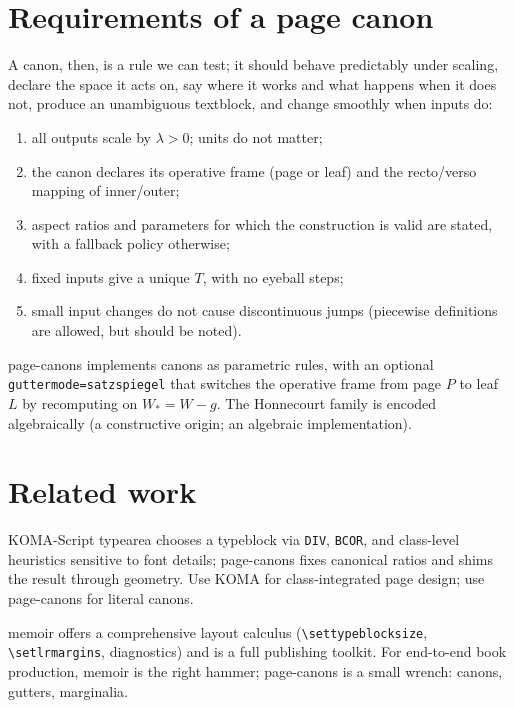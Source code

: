 \documentclass[11pt, twoside, openany]{book}
\newcommand{\pkg}[1]{\textsf{#1}}
\newcommand{\cmd}[1]{\texttt{\textbackslash #1}}
\begin{document}
\section{Requirements of a page canon}\label{sec:reqpagecanons}

A canon, then, is a rule we can test; it should behave predictably under scaling, declare the space it acts on, say where it works and what happens when it does not, produce an unambiguous textblock, and change smoothly when inputs do:
\begin{enumerate}
	\item all outputs scale by $\lambda>0$; units do not matter;
	\item the canon declares its operative frame (page or leaf) and the recto/verso mapping of inner/outer;
	\item aspect ratios and parameters for which the construction is valid are stated, with a fallback policy otherwise;
	\item fixed inputs give a unique $T$, with no eyeball steps;
	\item small input changes do not cause discontinuous jumps (piecewise definitions are allowed, but should be noted).
\end{enumerate}

\pkg{page-canons} implements canons as parametric rules, with an optional \texttt{guttermode=satzspiegel} that switches the operative frame from page $P$ to leaf $L$ by recomputing on $W_\ast=W-g$. The Honnecourt family is encoded algebraically (a constructive origin; an algebraic implementation).

\section{Related work}\label{sec:relatedwork}

KOMA-Script \cite{koma-script} \pkg{typearea} chooses a typeblock via \texttt{DIV}, \texttt{BCOR}, and class-level heuristics sensitive to font details; \pkg{page-canons} fixes canonical ratios and shims the result through \pkg{geometry}. Use KOMA for class-integrated page design; use \pkg{page-canons} for literal canons.

\pkg{memoir} \cite{memoir} offers a comprehensive layout calculus (\cmd{settypeblocksize}, \cmd{setlrmargins}, diagnostics) and is a full publishing toolkit. For end-to-end book production, \pkg{memoir} is the right hammer; \pkg{page-canons} is a small wrench: canons, gutters, marginalia.
\end{document}
